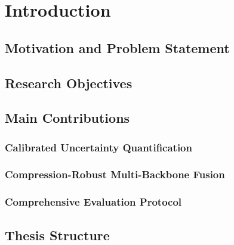 %



\chapter{Introduction}\label{chap:intro}

\section{Motivation and Problem Statement}\label{sec:motivation}

\section{Research Objectives}\label{sec:objectives}

\section{Main Contributions}\label{sec:contributions}
\subsection{Calibrated Uncertainty Quantification}
\subsection{Compression-Robust Multi-Backbone Fusion}
\subsection{Comprehensive Evaluation Protocol}

\section{Thesis Structure}\label{sec:structure}



